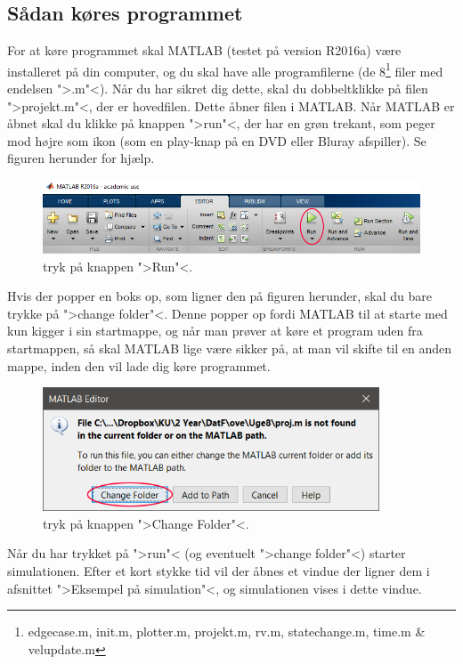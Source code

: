 \documentclass[a4paper,10pt]{article} 	%
\numberwithin{equation}{section}
\begin{document}
	\subsection{Sådan køres programmet}
	For at køre programmet skal MATLAB (testet på version R2016a) være installeret på din computer, og du skal have alle programfilerne (de 8\footnote{edgecase.m, init.m, plotter.m, projekt.m, rv.m, statechange.m, time.m \& velupdate.m} filer med endelsen ">.m"<). Når du har sikret dig dette, skal du dobbeltklikke på filen ">projekt.m"<, der er hovedfilen. Dette åbner filen i MATLAB. Når MATLAB er åbnet skal du klikke på knappen ">run"<, der har en grøn trekant, som peger mod højre som ikon (som en play-knap på en DVD eller Bluray afspiller). Se figuren herunder for hjælp.
	\begin{figure}[H]
		\centering
		\includegraphics[width=\textwidth]{img/run.png}
		\caption{tryk på knappen ">Run"<.}
		\label{fig:run}
	\end{figure}
	
	Hvis der popper en boks op, som ligner den på figuren herunder, skal du bare trykke på ">change folder"<. Denne popper op fordi MATLAB til at starte med kun kigger i sin startmappe, og når man prøver at køre et program uden fra startmappen, så skal MATLAB lige være sikker på, at man vil skifte til en anden mappe, inden den vil lade dig køre programmet.
	\begin{figure}[H]
		\centering
		\includegraphics[width=10cm]{img/folder.png}
		\caption{tryk på knappen ">Change Folder"<.}
		\label{fig:folder}
	\end{figure}
	
	Når du har trykket på ">run"< (og eventuelt ">change folder"<) starter simulationen. Efter et kort stykke tid vil der åbnes et vindue der ligner dem i afsnittet ">Eksempel på simulation"<, og simulationen vises i dette vindue.
	
\end{document}

